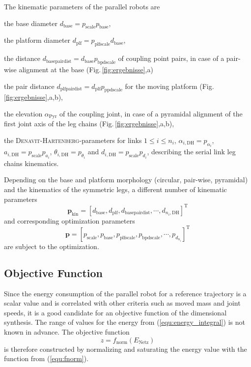 \documentclass[fleqn,a4paper,10pt]{article}
\newcommand{\bm}[1]{\mathbf{#1}}
\newcommand{\transp}[0]{{\mathrm{T}}}
\begin{document}
\begin{multicols}{2}
The kinematic parameters of the parallel robots are
%
\begin{compactitem}
\item the base diameter $d_\mathrm{base}=p_\mathrm{scale} p_\mathrm{base}$,
\item the platform diameter $d_\mathrm{plf}=p_\mathrm{plfscale} d_\mathrm{base}$,
\item the distance $d_\mathrm{basepairdist}=d_\mathrm{base} p_\mathrm{bpdscale}$ of coupling point pairs, in case of a pair-wise alignment at the base (Fig.\,\ref{fig:ergebnisse},a)
\item the pair distance $d_\mathrm{plfpairdist}=d_\mathrm{plf} p_\mathrm{ppdscale}$ for the moving platform (Fig.\,\ref{fig:ergebnisse},a,b),
\item the elevation $\alpha_\mathrm{Pyr}$ of the coupling joint, in case of a pyramidal alignment of the first joint axis of the leg chains (Fig.\,\ref{fig:ergebnisse},a,b),
\item the \textsc{Denavit-Hartenberg}-parameters for links $1\le i \le n_i$, $\alpha_{i,\mathrm{DH}}=p_{\alpha_i}$, $a_{i,\mathrm{DH}}=p_\mathrm{scale} p_{a_i}$, $\theta_{i,\mathrm{DH}}=p_{\theta_i}$ and $d_{i,\mathrm{DH}}=p_\mathrm{scale} p_{d_i}$, describing the serial link leg chains kinematics.
\end{compactitem}
%
Depending on the base and platform morphology (circular, pair-wise, pyramidal) and the kinematics of the symmetric legs, a different number of kinematic parameters
%
\begin{equation}
\bm{p}_\mathrm{kin}=[d_\mathrm{base}, d_\mathrm{plf}, d_\mathrm{basepairdist}, \cdots, d_{{n_i},\mathrm{DH}} ]^\transp %
\end{equation}
%
and corresponding optimization parameters
%
\begin{equation}
\bm{p}=[p_\mathrm{scale}, p_\mathrm{base}, p_\mathrm{plfscale}, p_\mathrm{bpdscale}, \cdots, p_{d_{n_i}}]^\transp
\end{equation}
%
are subject to the optimization.

\subsection{Objective Function}
\label{sec:opt_objective}

Since the energy consumption of the parallel robot for a reference trajectory is a scalar value and is correlated with other criteria such as moved mass and joint speeds, it is a good candidate for an objective function of the dimensional synthesis.
The range of values for the energy from (\ref{equ:energy_integral}) is not known in advance.
The objective function
%
\begin{equation}
z=f_\mathrm{norm}(E_{\mathrm{Netz}})
\end{equation}
%
is therefore constructed by normalizing and saturating the energy value with the function from (\ref{equ:fnorm}).



\end{multicols}
\end{document}
